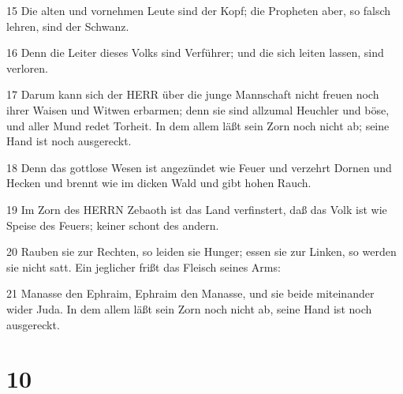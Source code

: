\par 15 Die alten und vornehmen Leute sind der Kopf; die Propheten aber, so falsch lehren, sind der Schwanz.
\par 16 Denn die Leiter dieses Volks sind Verführer; und die sich leiten lassen, sind verloren.
\par 17 Darum kann sich der HERR über die junge Mannschaft nicht freuen noch ihrer Waisen und Witwen erbarmen; denn sie sind allzumal Heuchler und böse, und aller Mund redet Torheit. In dem allem läßt sein Zorn noch nicht ab; seine Hand ist noch ausgereckt.
\par 18 Denn das gottlose Wesen ist angezündet wie Feuer und verzehrt Dornen und Hecken und brennt wie im dicken Wald und gibt hohen Rauch.
\par 19 Im Zorn des HERRN Zebaoth ist das Land verfinstert, daß das Volk ist wie Speise des Feuers; keiner schont des andern.
\par 20 Rauben sie zur Rechten, so leiden sie Hunger; essen sie zur Linken, so werden sie nicht satt. Ein jeglicher frißt das Fleisch seines Arms:
\par 21 Manasse den Ephraim, Ephraim den Manasse, und sie beide miteinander wider Juda. In dem allem läßt sein Zorn noch nicht ab, seine Hand ist noch ausgereckt.

\chapter{10}

